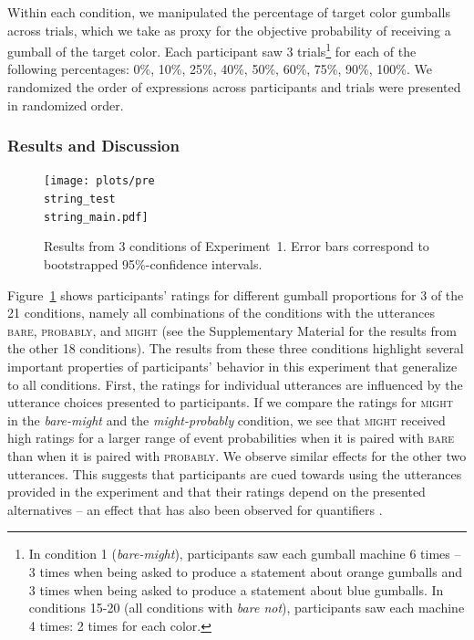 \documentclass[man, floatsintext]{apa6}
\begin{document}
\noindent Within each condition, we manipulated the percentage of target color gumballs across trials, which we take as proxy for the objective probability of receiving a gumball of the target color. 
Each participant saw 3 trials\footnote{In condition 1 (\textit{bare-might}), participants saw each gumball machine 6 times -- 3 times when being asked to produce a statement about orange gumballs and 3 times when being asked to produce a statement about blue gumballs. In conditions 15-20 (all conditions with \textit{bare not}), participants saw each machine 4 times: 2 times for each color.} 
for each of the following percentages: 0\%, 10\%, 25\%, 40\%, 50\%, 60\%, 75\%, 90\%, 100\%. We randomized the order of expressions across participants and trials were presented in randomized order.

\subsubsection{Results and Discussion}

\begin{figure}
\texttt{[image: plots/pre\\string\_test\\string\_main.pdf]} 
\caption{Results from 3 conditions of Experiment~1. Error bars correspond to bootstrapped 95\%-confidence intervals. \label{fig:norming-results-main} }
\end{figure}

Figure~\ref{fig:norming-results-main} shows participants' ratings for different gumball proportions for 3 of the 21 conditions, namely all combinations of the conditions
with the utterances \textsc{bare}, \textsc{probably}, and \textsc{might} (see the Supplementary Material for the results from the other 18 conditions). 
The results from these three conditions highlight several important properties of participants'
behavior in this experiment that generalize to all conditions.
First, the ratings for individual utterances are influenced by the utterance choices presented to participants.
If we compare the ratings for \textsc{might} in the \textit{bare-might} and the \textit{might-probably} condition, we see that \textsc{might} received high ratings for a larger
range of event probabilities when it is paired with \textsc{bare} than when it is paired with \textsc{probably}. We observe similar effects for the other two utterances.
This suggests that participants are cued towards using the utterances provided in the experiment and that their ratings depend on the presented alternatives -- an effect that
has also been observed for quantifiers \parencite{Degen2016}.
\end{document}
